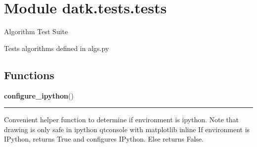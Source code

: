 %
%
%


\section{Module datk.tests.tests}

    \label{datk:tests:tests}
Algorithm Test Suite

Tests algorithms defined in algs.py



  \subsection{Functions}

    \label{datk:tests:tests:configure_ipython}

    \vspace{0.5ex}

\hspace{.8\funcindent}\begin{boxedminipage}{\funcwidth}

    \raggedright \textbf{configure\_ipython}()

    \vspace{-1.5ex}

    \rule{\textwidth}{0.5\fboxrule}
\setlength{\parskip}{2ex}
    Convenient helper function to determine if environment is ipython. Note
    that drawing is only safe in ipython qtconsole with matplotlib inline 
    If environment is IPython, returns True and configures IPython. Else 
    returns False.

\setlength{\parskip}{1ex}
    \end{boxedminipage}


